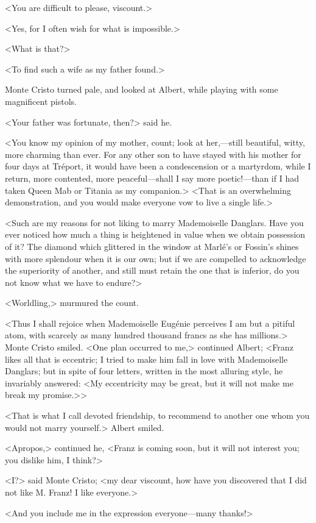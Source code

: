  <You are difficult to please, viscount.> 

 <Yes, for I often wish for what is impossible.> 

 <What is that?> 

 <To find such a wife as my father found.> 

 Monte Cristo turned pale, and looked at Albert, while playing with some magnificent pistols. 

 <Your father was fortunate, then?> said he. 

 <You know my opinion of my mother, count; look at her,—still beautiful, witty, more charming than ever. For any other son to have stayed with his mother for four days at Tréport, it would have been a condescension or a martyrdom, while I return, more contented, more peaceful—shall I say more poetic!—than if I had taken Queen Mab or Titania as my companion.>  <That is an overwhelming demonstration, and you would make everyone vow to live a single life.> 

 <Such are my reasons for not liking to marry Mademoiselle Danglars. Have you ever noticed how much a thing is heightened in value when we obtain possession of it? The diamond which glittered in the window at Marlé's or Fossin's shines with more splendour when it is our own; but if we are compelled to acknowledge the superiority of another, and still must retain the one that is inferior, do you not know what we have to endure?> 

 <Worldling,> murmured the count. 

 <Thus I shall rejoice when Mademoiselle Eugénie perceives I am but a pitiful atom, with scarcely as many hundred thousand francs as she has millions.> Monte Cristo smiled. <One plan occurred to me,> continued Albert; <Franz likes all that is eccentric; I tried to make him fall in love with Mademoiselle Danglars; but in spite of four letters, written in the most alluring style, he invariably answered: <My eccentricity may be great, but it will not make me break my promise.>> 

 <That is what I call devoted friendship, to recommend to another one whom you would not marry yourself.> Albert smiled. 

 <Apropos,> continued he, <Franz is coming soon, but it will not interest you; you dislike him, I think?> 

 <I?> said Monte Cristo; <my dear viscount, how have you discovered that I did not like M. Franz! I like everyone.> 

 <And you include me in the expression everyone—many thanks!> 

